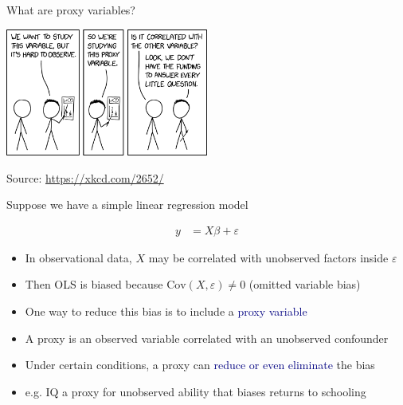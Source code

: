 \documentclass[aspectratio=169]{beamer}
\begin{document}
\begin{frame}

\begin{center}
\Large What are proxy variables?
\end{center}

\bigskip{}

\begin{center}
\includegraphics[width=0.5\textwidth]{proxy_variable.png}
\end{center}

\bigskip{}

\begin{center}
\small Source: \url{https://xkcd.com/2652/}
\end{center}

\end{frame}

\begin{frame}

Suppose we have a simple linear regression model

\begin{align*}
y &= X\beta + \varepsilon
\end{align*}

\begin{itemize}
\itemsep1.5em
\item<2-> In observational data, $X$ may be correlated with unobserved factors inside $\varepsilon$
\item<3-> Then OLS is biased because $\text{Cov}(X,\varepsilon) \neq 0$ (omitted variable bias)
\item<4-> One way to reduce this bias is to include a \textcolor{navy}{proxy variable}
\item<5-> A proxy is an observed variable correlated with an unobserved confounder
\item<6-> Under certain conditions, a proxy can \textcolor{navy}{reduce or even eliminate} the bias
\item<7-> e.g. IQ a proxy for unobserved ability that biases returns to schooling \end{itemize}

\end{frame}
\end{document}
